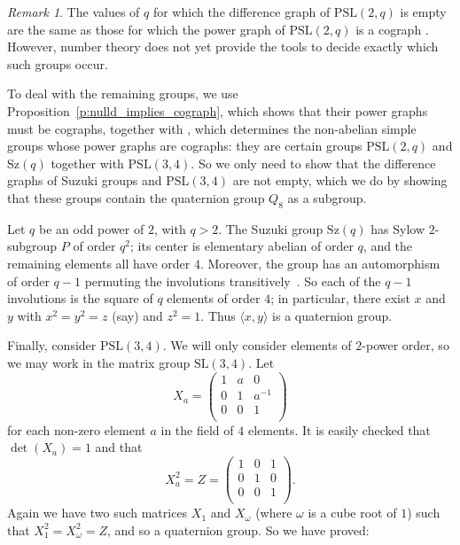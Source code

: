 \documentclass[12pt]{amsart}
\theoremstyle{plain}
\theoremstyle{remark}
\newtheorem{remark}[theorem]{Remark}
\theoremstyle{definition}
\begin{document}
\begin{remark}
The values of $q$ for which the difference graph of $\mathrm{PSL}(2,q)$ is empty are
the same as those for which the power graph of $\mathrm{PSL}(2,q)$ is a cograph
\cite[Proposition 8.7]{gog}. However, number theory does not yet provide the
tools to decide exactly which such groups occur.
\end{remark}

To deal with the remaining groups, we use Proposition~\ref{p:nulld_implies_cograph}, which shows that their power graphs must be cographs, together with
\cite[Theorem 1.3]{cmm}, which determines the non-abelian simple groups whose
power graphs are cographs: they are certain groups
$\mathrm{PSL}(2,q)$ and $\mathrm{Sz}(q)$ together with $\mathrm{PSL}(3,4)$.
So we only need to show that the difference graphs of Suzuki groups and 
$\mathrm{PSL}(3,4)$ are not empty, which we do by showing that these groups
contain the quaternion group $Q_8$ as a subgroup.

Let $q$ be an odd power of $2$, with $q>2$. The Suzuki group $\mathrm{Sz}(q)$
has Sylow $2$-subgroup $P$ of order $q^2$; its center is elementary abelian
of order $q$, and the remaining elements all have order $4$. Moreover, the
group has an automorphism of order $q-1$ permuting the involutions
transitively~\cite{higman:sz}. So each of the $q-1$ involutions is the square
of $q$ elements of order $4$; in particular, there exist $x$ and $y$ with
$x^2=y^2=z$ (say) and $z^2=1$. Thus $\langle x,y\rangle$ is a quaternion group.

Finally, consider $\mathrm{PSL}(3,4)$. We will only consider elements of
$2$-power order, so we may work in the matrix group $\mathrm{SL}(3,4)$.
Let
\[X_a=\begin{pmatrix}1&a&0\\0&1&a^{-1}\\0&0&1\\\end{pmatrix}\]
for each non-zero element $a$ in the field of $4$ elements. It is easily
checked that $\det(X_a)=1$ and that
\[X_a^2=Z=\begin{pmatrix}1&0&1\\0&1&0\\0&0&1\\\end{pmatrix}.\]
Again we have two such matrices $X_1$ and $X_\omega$ (where $\omega$ is a
cube root of $1$) such that $X_1^2=X_\omega^2=Z$, and so a quaternion group.
So we have proved:
\end{document}
